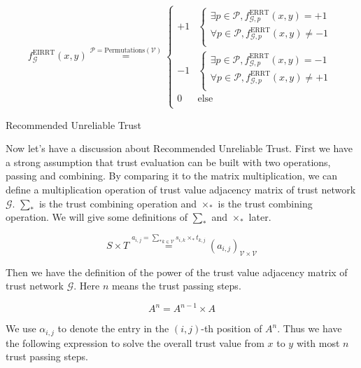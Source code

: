 \documentclass{article}
\begin{document}
\begin{equation}
f_{\mathcal{G}}^{\text{EIRRT}}(x,y)\overset{\mathcal{P}=\text{Permutations}(\mathcal{V})}{=}\left\{
\begin{array}{cc}
 +1 & \left\{
\begin{array}{c}
 \exists \mathit{p}\in \mathcal{P},f_{\mathcal{G},\mathit{p}}^{\text{ERRT}}(x,y)=+1 \\
 \forall \mathit{p}\in \mathcal{P},f_{\mathcal{G},\mathit{p}}^{\text{ERRT}}(x,y)\neq -1 \\
\end{array}
\right. \\
 -1 & \left\{
\begin{array}{c}
 \exists \mathit{p}\in \mathcal{P},f_{\mathcal{G},\mathit{p}}^{\text{ERRT}}(x,y)=-1 \\
 \forall \mathit{p}\in \mathcal{P},f_{\mathcal{G},\mathit{p}}^{\text{ERRT}}(x,y)\neq +1 \\
\end{array}
\right. \\
 0 & \text{else} \\
\end{array}
\right.
\end{equation}

Recommended Unreliable Trust

Now let{'}s have a discussion about Recommended Unreliable Trust. First we have a strong assumption that trust evaluation can be built with two operations,
passing and combining. By comparing it to the matrix multiplication, we can define a multiplication operation of trust value adjacency matrix of
trust network \(\mathcal{G}\). \(\sum _*\) is the trust combining operation and \(\times _*\) is the trust combining operation. We will give some
definitions of \(\sum _*\) and \(\times _*\) later.

\begin{equation}
S\times T\overset{a_{i,j}=\underset{k\in \mathcal{V}}{\sum _*}s_{i,k}\times _*t_{k,j}}{=}\left(a_{i,j}\right)_{\mathcal{V}\times \mathcal{V}}
\end{equation}

Then we have the definition of the power of the trust value adjacency matrix of trust network \(\mathcal{G}\). Here \(n\) means the trust passing
steps.

\begin{equation}
A^n=A^{n-1}\times A
\end{equation}

We use \(\alpha _{i,j}\) to denote the entry in the \((i,j)\)-th position of \(A^n\). Thus we have the following expression to solve the overall
trust value from \(x\) to \(y\) with most \(n\) trust passing steps.
\end{document}
